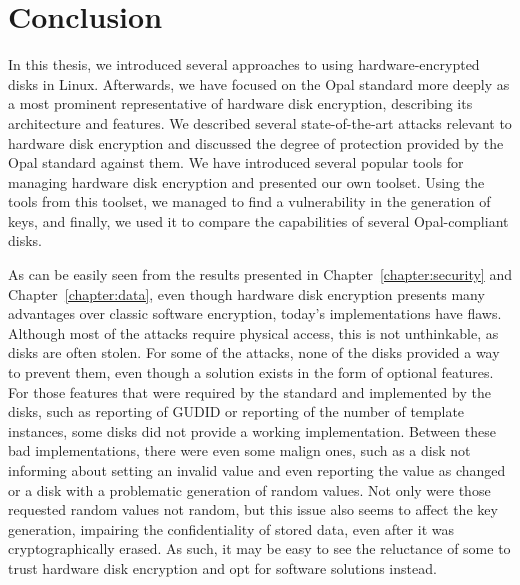 

















\chapter{Conclusion}

In this thesis, we introduced several approaches to using hardware-encrypted disks in Linux. Afterwards, we have focused on the Opal standard more deeply as a most prominent representative of hardware disk encryption, describing its architecture and features.
We described several state-of-the-art attacks relevant to hardware disk encryption and discussed the degree of protection provided by the Opal standard against them.
We have introduced several popular tools for managing hardware disk encryption and presented our own toolset. 
Using the tools from this toolset, we managed to find a vulnerability in the generation of keys, and finally, we used it to compare the capabilities of several Opal-compliant disks. 


As can be easily seen from the results presented in Chapter~\ref{chapter:security} and Chapter~\ref{chapter:data},
even though hardware disk encryption presents many advantages over classic software encryption, today's implementations have flaws. Although most of the attacks require physical access, this is not unthinkable, as disks are often stolen.
For some of the attacks, none of the disks provided a way to prevent them, even though a solution exists in the form of optional features. For those features that were required by the standard and implemented by the disks, 
such as reporting of GUDID or reporting of the number of template instances,
some disks did not provide a working implementation. Between these bad implementations, there were even some malign ones, such as a disk not informing about setting an invalid value and even reporting the value as changed or a disk with a problematic generation of random values. Not only were those requested random values not random, but this issue also seems to affect the key generation, impairing the confidentiality of stored data, even after it was cryptographically erased.
As such, it may be easy to see the reluctance of some to trust hardware disk encryption and opt for software solutions instead.

